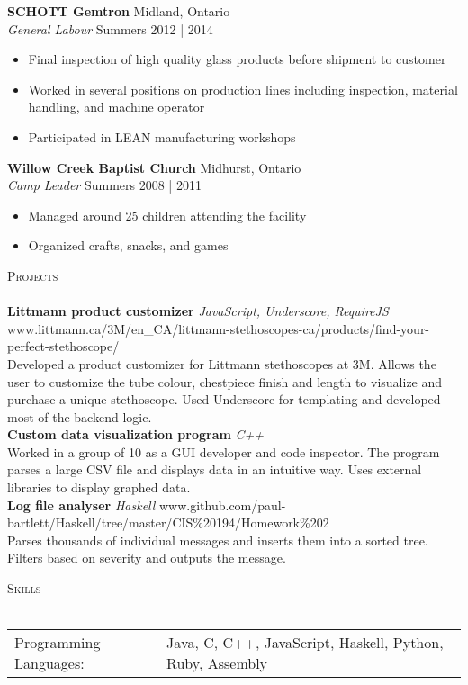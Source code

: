 \documentclass[a4paper]{article}
\newcommand{\lineunder} {
    \vspace*{-8pt} \\
    \hspace*{-18pt} \hrulefill \\
}
\newcommand{\header} [1] {
    {\hspace*{-18pt}\vspace*{6pt} \textsc{#1}}
    \vspace*{-6pt} \lineunder
}
\begin{document}
\textbf{SCHOTT Gemtron} \hfill Midland, Ontario\\
\textit{General Labour} \hfill Summers 2012 | 2014\\
\vspace{-1mm}
\begin{itemize} \itemsep 1pt
	\item Final inspection of high quality glass products before shipment to customer
	\item Worked in several positions on production lines including inspection, material handling, and machine operator
	\item Participated in LEAN manufacturing workshops
\end{itemize}

\textbf{Willow Creek Baptist Church} \hfill Midhurst, Ontario\\
\textit{Camp Leader} \hfill Summers 2008 | 2011\\
\vspace{-1mm}
\begin{itemize} \itemsep 1pt
	\item Managed around 25 children attending the facility
	\item Organized crafts, snacks, and games
\end{itemize}

\header{Projects}

{\textbf{Littmann product customizer} \sl JavaScript, Underscore, RequireJS} \hfill www.littmann.ca/3M/en\_CA/littmann-stethoscopes-ca/products/find-your-perfect-stethoscope/\\
\vspace*{1mm}
Developed a product customizer for Littmann stethoscopes at 3M. Allows the user to customize the tube colour, chestpiece finish and length to visualize and purchase a unique stethoscope. Used Underscore for templating and developed most of the backend logic.\\
\vspace*{2mm}
{\textbf{Custom data visualization program} \sl C++} \\
\vspace*{1mm}
Worked in a group of 10 as a GUI developer and code inspector. The program parses a large CSV file and displays data in an intuitive way. Uses external libraries to display graphed data.\\
\vspace*{2mm}
{\textbf{Log file analyser} \sl Haskell} \hfill www.github.com/paul-bartlett/Haskell/tree/master/CIS\%20194/Homework\%202\\
\vspace*{1mm}
Parses thousands of individual messages and inserts them into a sorted tree. Filters based on severity and outputs the message.\\
\vspace*{2mm}

\vspace*{2mm}
        
\header{Skills}
\begin{tabular}{ l l }
	Programming Languages: & Java, C, C++, JavaScript, Haskell, Python, Ruby, Assembly \\
\end{tabular}

\vspace*{2mm}

\ 
\end{document}
